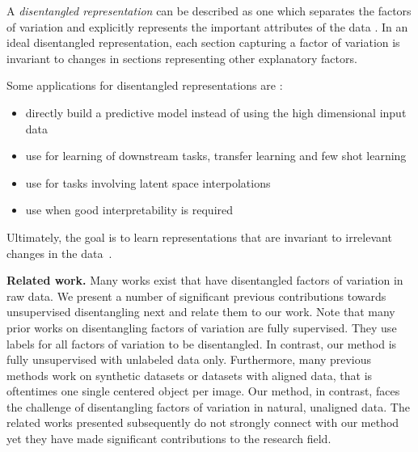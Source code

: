 \documentclass[a4paper,12pt]{report}
\begin{document}
A \textit{disentangled representation} can be described as one which separates the factors of variation and explicitly represents the important attributes of the data \cite{Framework4QuantEvalDisRepr}. In an ideal disentangled representation, each section capturing a factor of variation is invariant to changes in sections representing other explanatory factors.

Some applications for disentangled representations are \cite{ChallengeAssLofDisRepr}:
\begin{itemize}
  \item directly build a predictive model instead of using the high dimensional input data
  \item use for learning of downstream tasks, transfer learning and few shot learning
  \item use for tasks involving latent space interpolations
  \item use when good interpretability is required
\end{itemize}
Ultimately, the goal is to learn representations that are invariant to irrelevant changes in the data~\cite{Framework4QuantEvalDisRepr}.

\par \textbf{Related work.} Many works exist that have disentangled factors of variation in raw data. We present a number of significant previous contributions towards unsupervised disentangling next and relate them to our work. Note that many prior works on disentangling factors of variation are fully supervised. They use labels for all factors of variation to be disentangled. In contrast, our method is fully unsupervised with unlabeled data only. Furthermore, many previous methods work on synthetic datasets or datasets with aligned data, that is oftentimes one single centered object per image. Our method, in contrast, faces the challenge of disentangling factors of variation in natural, unaligned data. The related works presented subsequently do not strongly connect with our method yet they have made significant contributions to the research field. 

\end{document}
